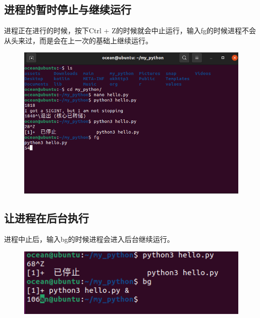 \documentclass{article}
\begin{document}
\subsection{进程的暂时停止与继续运行}
进程正在进行的时候，按下Ctrl + Z的时候就会中止运行，输入fg的时候进程不会从头来过，而是会在上一次的基础上继续运行。
\begin{figure}[H]
    \centering
    \includegraphics[width=1\linewidth]{continue.png}
\end{figure}


\subsection{让进程在后台执行}
进程中止后，输入bg的时候进程会进入后台继续运行。
\begin{figure}[H]
    \centering
    \includegraphics[width=1\linewidth]{bg.png}
\end{figure}

\newpage
\end{document}
